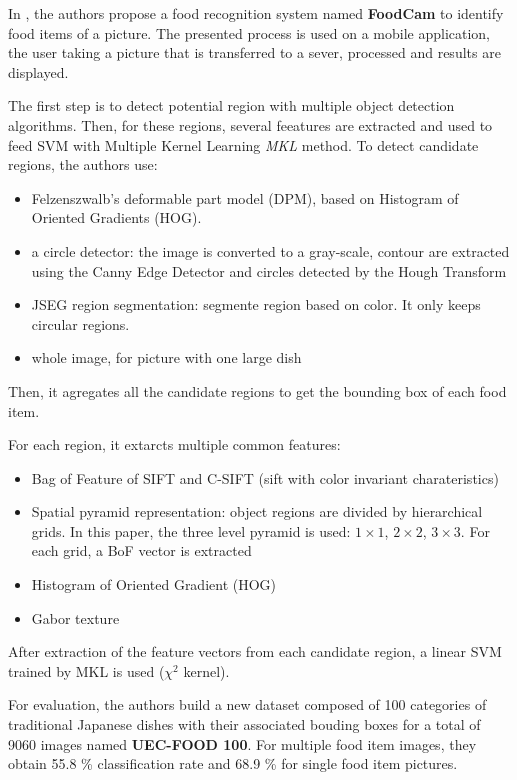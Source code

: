 In \cite{Matsuda2012a}, the authors propose a food recognition system named \textbf{FoodCam} to identify food items of a picture. The presented process is used on a mobile application, the user taking a picture that is transferred to a sever, processed and results are displayed.

The first step is to detect potential region with multiple object detection algorithms. Then, for these regions, several feeatures are extracted and used to feed SVM with Multiple Kernel Learning \textit{MKL} method. To detect candidate regions, the authors use:
\begin{itemize}
    \item Felzenszwalb’s deformable part model (DPM), based on Histogram of Oriented Gradients (HOG).
    \item a circle detector: the image is converted to a gray-scale, contour are extracted using the Canny Edge Detector and circles detected by the Hough Transform
    \item JSEG region segmentation: segmente region based on color. It only keeps circular regions.
    \item whole image, for picture with one large dish
\end{itemize}
Then, it agregates all the candidate regions to get the bounding box of each food item.

For each region, it extarcts multiple common features:
\begin{itemize}
    \item Bag of Feature of SIFT and C-SIFT (sift with color invariant charateristics)
    \item Spatial pyramid representation: object regions are divided by hierarchical grids. In this paper, the three level pyramid is used: $1 \times 1$, $2 \times 2$, $3 \times 3$. For each grid, a BoF vector is extracted
    \item Histogram of Oriented Gradient (HOG)
    \item Gabor texture
\end{itemize}

After extraction of the feature vectors from each candidate region, a linear SVM trained by MKL is used ($\chi^2$ kernel).

For evaluation, the authors build a new dataset composed of 100 categories of traditional Japanese dishes with their associated bouding boxes for a total of 9060 images named \textbf{UEC-FOOD 100}. For multiple food item images, they obtain 55.8 \% classification rate and 68.9 \% for single food item pictures.

